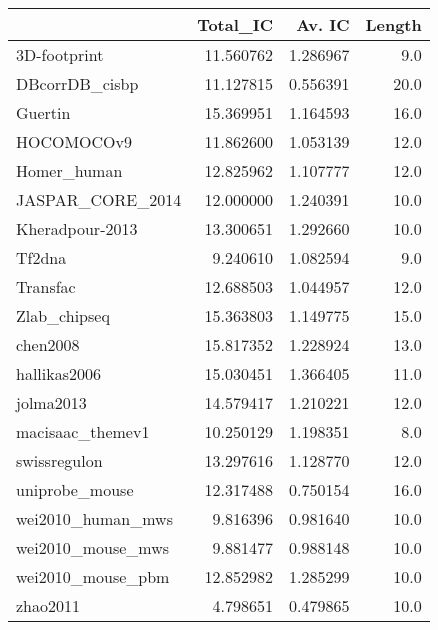 \begin{tabular}{lrrr}
\toprule
{} &   Total\_IC &    Av. IC & Length \\
\midrule
3D-footprint      &  11.560762 &  1.286967 &    9.0 \\
DBcorrDB\_cisbp    &  11.127815 &  0.556391 &   20.0 \\
Guertin           &  15.369951 &  1.164593 &   16.0 \\
HOCOMOCOv9        &  11.862600 &  1.053139 &   12.0 \\
Homer\_human       &  12.825962 &  1.107777 &   12.0 \\
JASPAR\_CORE\_2014  &  12.000000 &  1.240391 &   10.0 \\
Kheradpour-2013   &  13.300651 &  1.292660 &   10.0 \\
Tf2dna            &   9.240610 &  1.082594 &    9.0 \\
Transfac          &  12.688503 &  1.044957 &   12.0 \\
Zlab\_chipseq      &  15.363803 &  1.149775 &   15.0 \\
chen2008          &  15.817352 &  1.228924 &   13.0 \\
hallikas2006      &  15.030451 &  1.366405 &   11.0 \\
jolma2013         &  14.579417 &  1.210221 &   12.0 \\
macisaac\_themev1  &  10.250129 &  1.198351 &    8.0 \\
swissregulon      &  13.297616 &  1.128770 &   12.0 \\
uniprobe\_mouse    &  12.317488 &  0.750154 &   16.0 \\
wei2010\_human\_mws &   9.816396 &  0.981640 &   10.0 \\
wei2010\_mouse\_mws &   9.881477 &  0.988148 &   10.0 \\
wei2010\_mouse\_pbm &  12.852982 &  1.285299 &   10.0 \\
zhao2011          &   4.798651 &  0.479865 &   10.0 \\
\bottomrule
\end{tabular}
